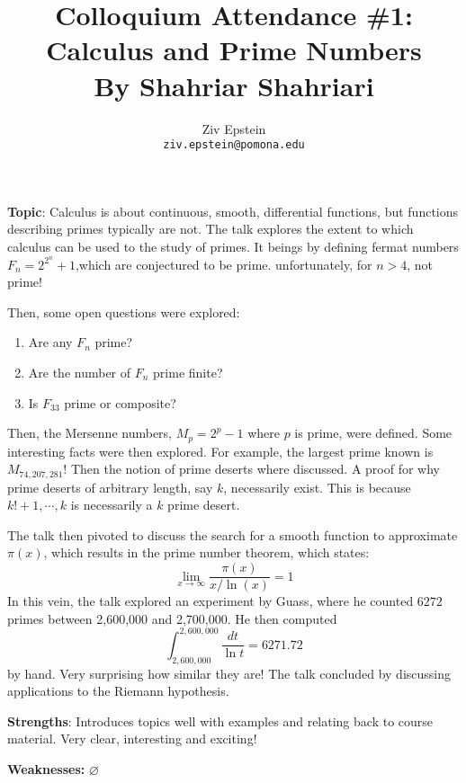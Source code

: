 \documentclass[12pt]{article}
\begin{document}
\nocite{*}

\title{Colloquium Attendance \#1: Calculus and Prime Numbers \\ By Shahriar Shahriari}


\author{Ziv Epstein \\ 
	\texttt{ziv.epstein@pomona.edu}}

\maketitle

\textbf{Topic}: Calculus is about continuous, smooth, differential functions, but functions describing primes typically are not. The talk explores the extent to which calculus can be used to the study of primes. It beings by defining fermat numbers $F_n=2^{2^n}+1$,which are conjectured to be prime. unfortunately, for $n>4$, not prime!

Then, some open questions were explored:
\begin{enumerate}
	\item Are any $F_n$ prime?
	\item  Are the number of $F_n$ prime finite? 
	\item Is $F_{33}$ prime or composite?
\end{enumerate}
Then, the Mersenne numbers, $M_p = 2^p-1$ where $p$ is prime, were defined. Some interesting facts were then explored. For example, the largest prime known is $M_{74,207,281}$! Then the notion of prime deserts where discussed. A proof for why prime deserts of arbitrary length, say $k$, necessarily exist. This is because $k! + 1,\cdots ,k$ is necessarily a $k$ prime desert.

The talk then pivoted to discuss the search for a smooth function to approximate $\pi(x)$, which results in the prime number theorem, which states: $$\lim_{x \to \infty} \frac{\pi(x)}{x/\ln(x)} = 1$$
In this vein, the talk explored an experiment by Guass, where he counted $6272$ primes between 2,600,000 and 2,700,000. He then computed $$\int_{2,600,000}^{2,600,000}\frac{dt}{\ln t} = 6271.72$$ by hand. Very surprising how similar they are!
The talk concluded by discussing applications to the Riemann hypothesis. 

\textbf{Strengths}: Introduces topics well with examples and relating back to course material. Very clear, interesting and exciting!

\textbf{Weaknesses:} $\varnothing$
\end{document}
